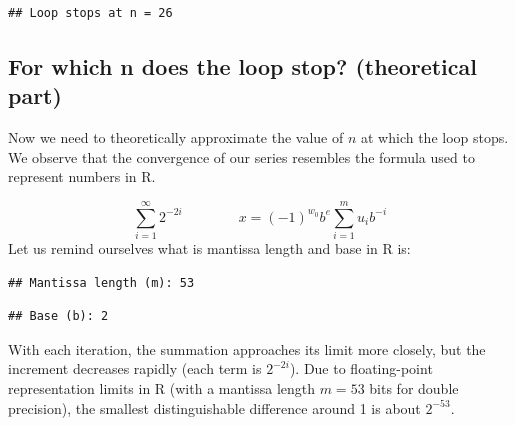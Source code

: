 \documentclass[
]{article}
\newenvironment{Shaded}{\begin{snugshade}}{\end{snugshade}}
\newcommand{\FunctionTok}[1]{\textcolor[rgb]{0.13,0.29,0.53}{\textbf{#1}}}
\newcommand{\NormalTok}[1]{#1}
\newcommand{\OtherTok}[1]{\textcolor[rgb]{0.56,0.35,0.01}{#1}}
\newcommand{\SpecialCharTok}[1]{\textcolor[rgb]{0.81,0.36,0.00}{\textbf{#1}}}
\newcommand{\StringTok}[1]{\textcolor[rgb]{0.31,0.60,0.02}{#1}}
\begin{document}
\begin{verbatim}
## Loop stops at n = 26
\end{verbatim}

\subsection{For which n does the loop stop? (theoretical
part)}\label{for-which-n-does-the-loop-stop-theoretical-part}

Now we need to theoretically approximate the value of \(n\) at which the
loop stops. We observe that the convergence of our series resembles the
formula used to represent numbers in R.

\[
\sum_{i=1}^{\infty} 2^{-2i} 
\quad\quad\quad\quad
x = (-1)^{w_0} b^{e} \sum_{i=1}^{m} u_i b^{-i}
\] Let us remind ourselves what is mantissa length and base in R is:

\begin{Shaded}
\end{Shaded}

\begin{verbatim}
## Mantissa length (m): 53
\end{verbatim}

\begin{Shaded}
\end{Shaded}

\begin{verbatim}
## Base (b): 2
\end{verbatim}

With each iteration, the summation approaches its limit more closely,
but the increment decreases rapidly (each term is \(2^{-2i}\)). Due to
floating-point representation limits in R (with a mantissa length
\(m = 53\) bits for double precision), the smallest distinguishable
difference around 1 is about \(2^{-53}\).
\end{document}
